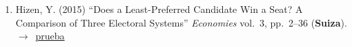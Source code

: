 \documentclass[12 pt, letter]{article}
\newenvironment{CitasMiTrabajo}{
    \begin{footnotesize}
    \begin{enumerate}[label={\footnotesize\emph{cita~\arabic*}},ref=\arabic*] %
        \setlength{\itemsep}{.1\itemsep}
        \setlength{\parskip}{.1\parskip}
    }{\end{enumerate}\end{footnotesize}}
\begin{document}
\begin{CitasMiTrabajo}
        \item Hizen, Y. (2015)
        ``Does a Least-Preferred Candidate Win a Seat? A Comparison of Three Electoral Systems''
        \emph{Economies} vol.\ 3, pp.\ 2--36 (\textbf{Suiza}). $\rightarrow$~\href{http://ericmagar.com/cv/cites/mrs/hizenThreeSystems2015economies.pdf}{prueba}

        \label{ncites:magar.etal.1998} %

%
%
%
%
%
%
%
%
%
%
%
        

\end{CitasMiTrabajo}
\end{document}
